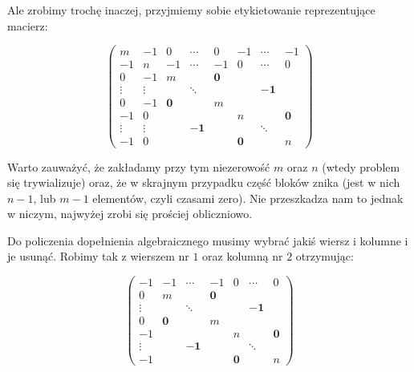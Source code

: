 \documentclass[a4paper,11pt]{article}
\begin{document}
Ale zrobimy trochę inaczej, przyjmiemy sobie etykietowanie reprezentujące macierz:

\begin{displaymath}
\left(
\begin{array}{cc|ccc|ccc}
m      & -1     & 0          & \cdots      & 0          & -1         & \cdots      & -1         \\
-1     & n      & -1         & \cdots      & -1         & 0          & \cdots      & 0          \\ \hline
0      & -1     & m          &             & \mathbf{0} &            &             &            \\
\vdots & \vdots &            & \ddots      &            &            & \mathbf{-1} &            \\
0      & -1     & \mathbf{0} &             & m          &            &             &            \\ \hline 
-1     & 0      &            &             &            & n          &             & \mathbf{0} \\
\vdots & \vdots &            & \mathbf{-1} &            &            & \ddots      &            \\
-1     & 0      &            &             &            & \mathbf{0} &             & n          

\end{array} \right)
\end{displaymath}


Warto zauważyć, że zakładamy przy tym niezerowość $m$ oraz $n$ (wtedy problem się trywializuje) oraz, że w skrajnym przypadku część bloków znika (jest w nich $n-1$, lub $m-1$ elementów, czyli czasami zero). Nie przeszkadza nam to jednak w niczym, najwyżej zrobi się prościej obliczniowo.

Do policzenia dopełnienia algebraicznego musimy wybrać jakiś wiersz i kolumne i je usunąć. Robimy tak z wierszem nr $1$ oraz kolumną nr $2$ otrzymując:

\begin{displaymath}
\left(
\begin{array}{c|ccc|ccc}
-1     & -1         & \cdots      & -1         & 0          & \cdots      & 0          \\ \hline
0      & m          &             & \mathbf{0} &            &             &            \\
\vdots &            & \ddots      &            &            & \mathbf{-1} &            \\
0      & \mathbf{0} &             & m          &            &             &            \\ \hline 
-1     &            &             &            & n          &             & \mathbf{0} \\
\vdots &            & \mathbf{-1} &            &            & \ddots      &            \\
-1     &            &             &            & \mathbf{0} &             & n          

\end{array} \right)
\end{displaymath}
\end{document}
